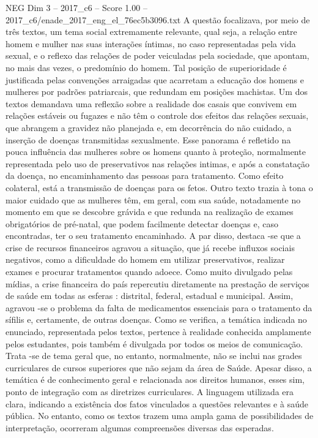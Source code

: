 \begin{textsample}{NEG Dim 3 – 2017\_c6 – Score 1.00 – 2017\_c6/enade\_2017\_eng\_el\_76ec5b3096.txt}
A questão focalizava, por meio de três textos, um tema social extremamente relevante, qual seja, a relação entre homem e mulher nas suas interações íntimas, no caso representadas pela vida sexual, e o reflexo das relações de poder veiculadas pela sociedade, que apontam, no mais das vezes, o predomínio do homem.
Tal posição de superioridade é justificada pelas convenções arraigadas que acarretam a educação dos homens e mulheres por padrões patriarcais, que redundam em posições machistas.
Um dos textos demandava uma reflexão sobre a realidade dos casais que convivem em relações estáveis ou fugazes e não têm o controle dos efeitos das relações sexuais, que abrangem a gravidez não planejada e, em decorrência do não cuidado, a inserção de doenças transmitidas sexualmente.
Esse panorama é refletido na pouca influência das mulheres sobre os homens quanto à proteção, normalmente representada pelo uso de preservativos nas relações intimas, e após a constatação da doença, no encaminhamento das pessoas para tratamento.
Como efeito colateral, está a transmissão de doenças para os fetos.
Outro texto trazia à tona o maior cuidado que as mulheres têm, em geral, com sua saúde, notadamente no momento em que se descobre grávida e que redunda na realização de exames obrigatórios de pré-natal, que podem facilmente detectar doenças e, caso encontradas, ter o seu tratamento encaminhado.
A par disso, destaca -se que a crise de recursos financeiros agravou a situação, que já recebe influxos sociais negativos, como a dificuldade do homem em utilizar preservativos, realizar exames e procurar tratamentos quando adoece.
Como muito divulgado pelas mídias, a crise financeira do país repercutiu diretamente na prestação de serviços de saúde em todas as esferas : distrital, federal, estadual e municipal.
Assim, agravou -se o problema da falta de medicamentos essenciais para o tratamento da sífilis e, certamente, de outras doenças.
Como se verifica, a temática indicada no enunciado, representada pelos textos, pertence à realidade conhecida amplamente pelos estudantes, pois também é divulgada por todos os meios de comunicação.
Trata -se de tema geral que, no entanto, normalmente, não se inclui nas grades curriculares de cursos superiores que não sejam da área de Saúde.
Apesar disso, a temática é de conhecimento geral e relacionada aos direitos humanos, esses sim, ponto de integração com as diretrizes curriculares.
A linguagem utilizada era clara, indicando a existência dos fatos vinculados a questões relevantes e à saúde pública.
No entanto, como os textos trazem uma ampla gama de possibilidades de interpretação, ocorreram algumas compreensões diversas das esperadas.

\end{textsample}
